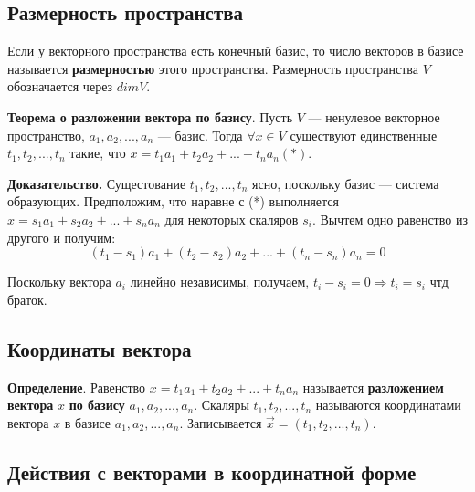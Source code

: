 \documentclass[a4paper]{article}
\begin{document}
    \subsection*{Размерность пространства}
    Если у векторного пространства есть конечный базис, то число векторов в базисе называется \textbf{размерностью} этого пространства.
    Размерность пространства $V$ обозначается через $dim V$.

    \begin{htheorem}
        \textbf{Теорема о разложении вектора по базису}. Пусть $V$ --- ненулевое векторное пространство, $a_1, a_2, ..., a_n$ --- базис. Тогда $\forall x \in V$ существуют единственные $t_1, t_2, ..., t_n$ такие, что $x = t_1a_1 + t_2a_2 + ... + t_na_n (*)$.
    \end{htheorem}


    \begin{hproof}
        \textbf{Доказательство.} Сущестование $t_1, t_2, ..., t_n$ ясно, поскольку базис --- система образующих. Предположим, что наравне с (*) выполняется $x = s_1a_1 + s_2a_2 + ... + s_na_n$ для некоторых скаляров $s_i$. Вычтем одно равенство из другого и получим: \begin{equation}
        (t_1-s_1)
                                                                                                                                                                                                                                                                             a_1 + (t_2-s_2)a_2 + ... + (t_n-s_n)a_n = 0
        \end{equation}

        Поскольку вектора $a_i$ линейно независимы, получаем, $t_i-s_i = 0 \Rightarrow t_i = s_i$ чтд браток.
    \end{hproof}



    \subsection*{Координаты вектора}
    \textbf{Определение}. Равенство $x = t_1a_1 + t_2a_2 + ... + t_na_n$ называется \textbf{разложением вектора} $x$ \textbf{по базису} $a_1, a_2, ..., a_n$. Скаляры $t_1, t_2, ..., t_n$ называются координатами вектора $x$ в базисе $a_1, a_2, ..., a_n$. Записывается $\vec{x} = (t_1, t_2, ..., t_n)$.

    \subsection*{Действия с векторами в координатной форме}
\end{document}
